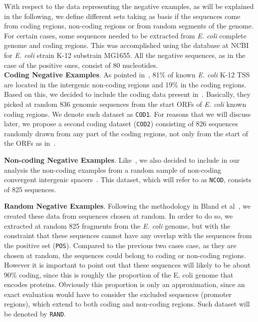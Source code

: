 \documentclass[conference]{IEEEtran}
\begin{document}
With respect to the data representing the negative examples, as will be explained in the following, we define different sets taking as basis if the sequences come from coding regions, non-coding regions or from random segments of the genome. For certain cases, some sequences needed to be extracted from {\it E. coli } complete genome and coding regions. This was accomplished using the database at NCBI~\cite{benson2000} for {\it E. coli } strain K-12 substrain MG1655. All the negative sequences, as in the case of the positive ones, consist of 80 nucleotides.\\

\noindent
{\bf Coding Negative Examples}. As pointed in~\cite{gordon2003}, 81\% of known {\it E. coli} K-12 TSS are located in the intergenic non-coding regions and 19\% in the coding regions. Based on this, we decided to include the coding data present in~\cite{gordon2003,song2011a}. Basically, they picked at random 836 genomic sequences from the start ORFs of {\it E. coli} known coding regions. We denote such dataset as {\tt COD1}. For reasons that we will discuss later,  we propose a second coding dataset ({\tt COD2}) consisting of 826 sequences randomly drawn from any part of the coding regions, not only from the start of the ORFs as in~\cite{gordon2003,song2011a}.

\noindent
{\bf Non-coding Negative Examples}. Like~\cite{gordon2003,song2011a}, we also decided to include in our analysis the non-coding examples from a random sample of non-coding convergent intergenic spacers~\cite{palleja2009}. This dataset, which will refer to as {\tt NCOD}, consists of 825 sequences.

\noindent
{\bf Random Negative Examples}. Following the methodology in Bland et al~\cite{bland2010}, we created these data from sequences chosen at random. In order to do so, we extracted at random 825 fragments from the {\it E. coli} genome, but with the constraint that these sequences cannot have any overlap with the sequences from the positive set ({\tt POS}). Compared to the previous two cases case, as they are chosen at random, the sequences could belong to coding or non-coding regions. However it is important to point out that these sequences will likely to be about 90\% coding, since this is roughly the proportion of the E. coli genome that encodes proteins. Obviously this proportion is only an approximation, since an exact evaluation would have to consider the excluded sequences (promoter regions), which extend to both coding and non-coding regions. Such dataset will be denoted by {\tt RAND}.
\end{document}
